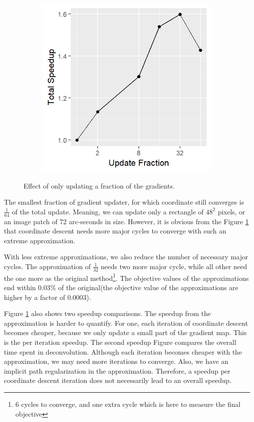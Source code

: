 \begin{figure}[h]
\begin{subfigure}[b]{0.35\linewidth}
		\includegraphics[width=\linewidth]{./chapters/10.results/gradient/ApproxUpdate/speedup_total.png}
	\end{subfigure}
	
	\caption{Effect of only updating a fraction of the gradients.}
	\label{results:gradients:update}
\end{figure}

The smallest fraction of gradient updater, for which coordinate still converges is $\frac{1}{64}$ of the total update. Meaning, we can update only a rectangle of $48^2$ pixels, or an image patch of 72 arc-seconds in size. However, it is obvious from the Figure \ref{results:gradients:update} that coordinate descent needs more major cycles to converge with such an extreme approximation.

With less extreme approximations, we also reduce the number of necessary major cycles. The approximation of $\frac{1}{32}$ needs two more major cycle, while all other need the one more as the original method\footnote{6 cycles to converge, and one extra cycle which is here to measure the final objective}. The objective values of the approximations end within 0.03\% of the original(the objective value of the approximations are higher by a factor of 0.0003).

Figure \ref{results:gradients:update} also shows two speedup comparisons. The speedup from the approximation is harder to quantify. For one, each iteration of coordinate descent becomes cheaper, because we only update a small part of the gradient map. This is the per iteration speedup. The second speedup Figure compares the overall time spent in deconvolution. Although each iteration becomes cheaper with the approximation, we may need more iterations to converge. Also, we have an implicit path regularization in the approximation. Therefore, a speedup per coordinate descent iteration does not necessarily lead to an overall speedup.

